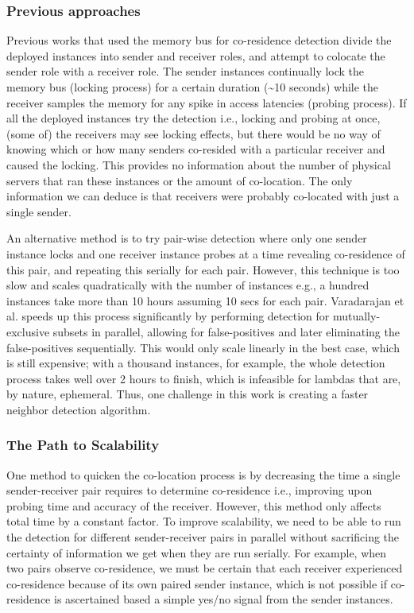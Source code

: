 \subsubsection{Previous approaches}
Previous works that used the memory bus for co-residence detection divide the
deployed instances into sender and receiver roles, and attempt to
colocate the sender role with a receiver role. The sender instances
continually lock the memory bus (locking process) for a certain duration
(\textasciitilde 10 seconds) while the receiver samples the memory for any spike
in access latencies (probing process). If all the deployed instances try the
detection i.e., locking and probing at once, (some of) the receivers may see
locking effects, but there would be no way of knowing which or how many senders
co-resided with a particular receiver and caused the locking. This provides
no information about the number of physical servers that ran these instances or
the amount of co-location. The only information we can deduce is that receivers
were probably co-located with just a single sender.

An alternative method is to try pair-wise detection where only one sender 
instance locks and one receiver instance probes at a time revealing co-residence
of this pair, and repeating this serially for each pair. However, this technique
is too slow and scales quadratically with the number of instances e.g., a
hundred instances take more than 10 hours assuming 10 secs for each pair.
Varadarajan et al.\cite{varad191016} speeds up this process significantly by
performing detection for mutually-exclusive subsets in parallel, allowing for
false-positives and later eliminating the false-positives
sequentially. This would only scale linearly in the best case, which is
still expensive; with a thousand instances, for example, the whole detection
process takes well over 2 hours to finish, which is infeasible for lambdas that
are, by nature, ephemeral. Thus, one challenge in this work is creating a faster
neighbor detection algorithm.

\subsubsection{The Path to Scalability}

One method to quicken the co-location process is by decreasing the time a single
sender-receiver pair requires to determine co-residence i.e., improving upon
probing time and accuracy of the receiver.  However, this method only affects
total time by a constant factor. To improve scalability, we need to be able to
run the detection for different sender-receiver pairs in parallel without
sacrificing the certainty of information we get when they are run serially.  For
example, when two pairs observe co-residence, we must be certain that each
receiver experienced co-residence because of its own paired sender instance, which
is not possible if co-residence is ascertained based a simple yes/no signal from
the sender instances. 

